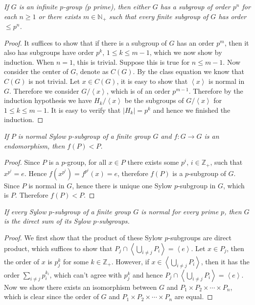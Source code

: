 \begin{problem}\em
If $G$ is an infinite $p$-group ($p$ prime), then either $G$ has a subgroup of order $p^n$ for each $n\ge 1$ or there exists $m\in\mathbb{N}_+$ such that every finite subgroup of $G$ has order $\le p^n$.
\end{problem}
\begin{proof}
It suffices to show that if there is a subgroup of $G$ has an order $p^m$, then it also has subgroups have order $p^k$, $1\le k\le m-1$, which we now show by induction. When $n=1$, this is trivial. Suppose this is true for $n\le m-1$. Now consider the center of $G$, denote as $C(G)$. By the class equation we know that $C(G)$ is not trivial. Let $x\in C(G)$, it is easy to show that $\left<x\right>$ is normal in $G$. Therefore we consider $G/\left<x\right>$, which is of an order $p^{m-1}$. Therefore by the induction hypothesis we have $H_k/\left<x\right>$ be the subgroups of $G/\left<x\right>$ for $1\le k\le m-1$. It is easy to verify that $|H_k|=p^k$ and hence we finished the induction.
\end{proof}
\begin{problem}\em
If $P$ is normal Sylow $p$-subgroup of a finite group $G$ and $f:G\to G$ is an endomorphism, then $f(P)<P$.
\end{problem}
\begin{proof}
Since $P$ is a $p$-group, for all $x\in P$ there exists some $p^i$, $i\in\mathbb{Z}_+$, such that $x^{p^i}=e$. Hence $f(x^{p^i})=f^{p^i}(x)=e$, therefore $f(P)$ is a $p$-subgroup of $G$. Since $P$ is normal in $G$, hence there is unique one Sylow $p$-subgroup in $G$, which is $P$. Therefore $f(P)<P$.
\end{proof}
\begin{problem}\em
If every Sylow $p$-subgroup of a finite group $G$ is normal for every prime $p$, then $G$ is the direct sum of its Sylow $p$-subgroups.
\end{problem}
\begin{proof}
We first show that the product of these Sylow $p$-subgroups are direct product, which suffices to show that $P_j\cap\left<\bigcup_{i\ne j}P_i\right>=\left<e\right>$. Let $x\in P_j$, then the order of $x$ is $p_j^k$ for some $k\in\mathbb{Z}_+$. However, if $x\in\left<\bigcup_{i\ne j}P_i\right>$, then it has the order $\sum_{i\ne j}p_i^{k_i}$, which can't agree with $p_j^k$ and hence $P_j\cap\left<\bigcup_{i\ne j}P_i\right>=\left<e\right>$. Now we show there exists an isomorphism between $G$ and $P_1\times P_2\times\cdots\times P_n$, which is clear since the order of $G$ and $P_1\times P_2\times\cdots\times P_n$ are equal.
\end{proof}

